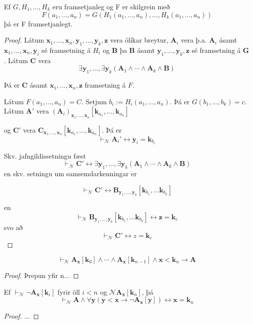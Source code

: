 \documentclass[12pt]{book}
\newcommand{\cN}{\mathcal{N}}
\newcommand{\bA}{\mathbf{A}}
\newcommand{\bB}{\mathbf{B}}
\newcommand{\bC}{\mathbf{C}}
\newcommand{\bG}{\mathbf{G}}
\newcommand{\bx}{\mathbf{x}}
\newcommand{\bk}{\mathbf{k}}
\newcommand{\by}{\mathbf{y}}
\newcommand{\bz}{\mathbf{z}}
\newcommand{\bxxn}{\bx_1, \dotsc, \bx_n}
\newcommand{\byyk}{\by_1, \dotsc, \by_k}
\newcommand{\aan}{a_1, \dotsc, a_n}
\newcommand{\bkaan}{\bk_{a_1}, \dotsc,\bk_{a_n}}
\newcommand{\vN}{\vdash_{\cN}}
\begin{document}
\begin{setn}[HS1]
 Ef $G, H_1, \dotsc, H_k$ eru framsetjanleg og F er skilgrein með
 \[ F(\aan) = G(H_1(\aan), \dotsc, H_k(\aan)) \]
 þá er F framsetjanlegt.
\end{setn}
\begin{proof}
  Látum $\bxxn, \byyk, \bz$ vera ólíkar breytur, $\bA_i$ vera
þ.a. $\bA_i$ ásamt $\bxxn, \by_i$ sé framsetning á $H_i$ og
$\bB$ þa $\bB$ ásamt $\byyk, \bz$ sé framsetning á $\bG$. Látum $\bC$
vera 
\[ \exists \by_1, \dotsc, \exists \by_k ( \bA_1 \wedge \dotsb \wedge \bA_k \wedge \bB )\]

Þá er $\bC$ ásamt $\bxxn, \bz$ framsetning á $F$.

Látum $F(\aan) = C$. Setjum $b_i := H_i (\aan)$.
Þá er $G(b_1, \dotsc,b_k) = c$. Látum $\bA'$ vera $(\bA_i)_{\bxxn}[\bkaan]$

og $\bC'$ vera $\bC_{\bxxn}[\bkaan]$. Þá er \[ \vN \bA_i' \leftrightarrow \by_i = \bk_{b_i} \]

Skv. jafngildissetningu fæst
\[\vN \bC' \leftrightarrow  \exists \by_1, \dotsc, \exists \by_k ( \bA_1 \wedge \dotsb \wedge \bA_k \wedge \bB )\]
en skv. setningu um samsemdarkenningar er

\[ \vN \bC' \leftrightarrow \bB_{\byyk} [\bk_{b_1}, \dotsc \bk_{b_k}] \]

en
\[ \vN \bB_{\byyk} [\bk_{b_1}, \dotsc \bk_{b_k}] \leftrightarrow \bz = \bk_c \]
svo að \[ \vN \bC' \leftrightarrow z = \bk_c\]

\end{proof}


\begin{setn}[HS2]
 \[ \vN \bA_{\bx}[\bk_0] \wedge \dotsb \wedge \bA_{\bx}[\bk_{n-1}] \wedge \bx < \bk_n \to \bA \]

 \begin{proof}
   Þrepun yfir n...
 \end{proof}
\end{setn}

\begin{setn}[HS3]
  Ef $\vN \lnot \bA_{\bx}[\bk_i]$ fyrir öll $i < n$ og $\cN \bA_{\bx}[\bk_n]$,
  þá \[ \vN \bA \wedge \forall \by ( \by < \bx  \to \lnot \bA_{\bx}[\by]) \leftrightarrow \bx = \bk_n \]

 \begin{proof}
...
 \end{proof}
\end{setn}
\end{document}
